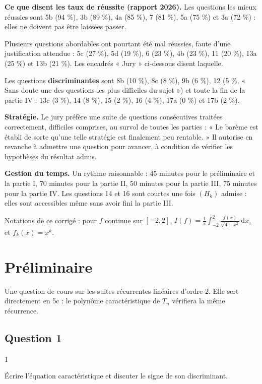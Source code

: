 \documentclass[11pt,a4paper]{article}
\begin{document}
\textbf{Ce que disent les taux de réussite (rapport 2026).} Les questions les mieux réussies sont 5b (94 \%), 3b (89 \%), 4a (85 \%), 7 (81 \%), 5a (75 \%) et 3a (72 \%) : elles ne doivent pas être laissées passer.

Plusieurs questions abordables ont pourtant été mal réussies, faute d'une justification attendue : 5c (27 \%), 5d (19 \%), 6 (23 \%), 4b (23 \%), 11 (20 \%), 13a (25 \%) et 13b (21 \%). Les encadrés « Jury » ci-dessous disent laquelle.

Les questions \textbf{discriminantes} sont 8b (10 \%), 8c (8 \%), 9b (6 \%), 12 (5 \%, « Sans doute une des questions les plus difficiles du sujet ») et toute la fin de la partie IV : 13c (3 \%), 14 (8 \%), 15 (2 \%), 16 (4 \%), 17a (0 \%) et 17b (2 \%).

\textbf{Stratégie.} Le jury préfère une suite de questions consécutives traitées correctement, difficiles comprises, au survol de toutes les parties : « Le barème est établi de sorte qu'une telle stratégie est finalement peu rentable. » Il autorise en revanche à admettre une question pour avancer, à condition de vérifier les hypothèses du résultat admis.

\textbf{Gestion du temps.} Un rythme raisonnable : 45 minutes pour le préliminaire et la partie I, 70 minutes pour la partie II, 50 minutes pour la partie III, 75 minutes pour la partie IV. Les questions 14 et 16 sont courtes une fois \((H_k)\) admise : elles sont accessibles même sans avoir fini la partie III.

Notations de ce corrigé : pour \(f\) continue sur \([-2,2]\), \(I(f)=\frac1\pi\int_{-2}^2\frac{f(x)}{\sqrt{4-x^2}}\,\mathrm dx\), et \(f_k(x)=x^k\).

\hypertarget{pruxe9liminaire}{%
\section{Préliminaire}\label{pruxe9liminaire}}

Une question de cours sur les suites récurrentes linéaires d'ordre 2. Elle sert directement en 5c : le polynôme caractéristique de \(T_n\) vérifiera la même récurrence.

\hypertarget{question-1}{%
\subsection{Question 1}\label{question-1}}

\begin{indication}{1}

Écrire l'équation caractéristique et discuter le signe de son discriminant.

\end{indication}
\end{document}
